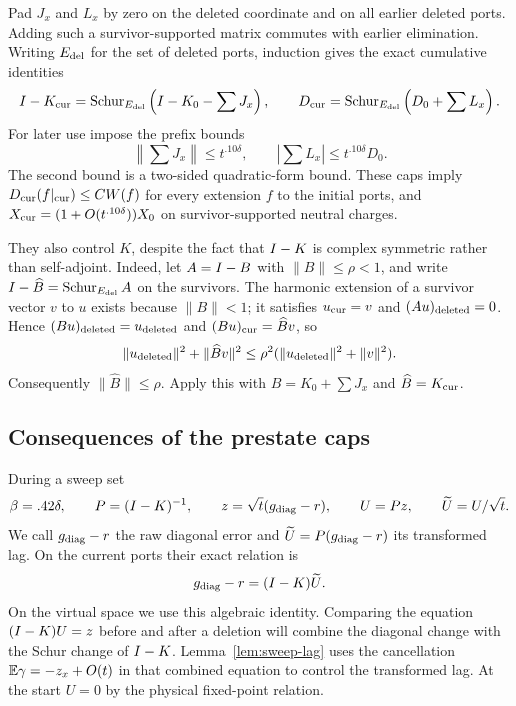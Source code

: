 Pad $J_x$ and $L_x$ by zero on the deleted coordinate and on all
earlier deleted ports. Adding such a survivor-supported matrix commutes
with earlier elimination. Writing $E_{\rm del}$ for the set of deleted
ports, induction gives the exact cumulative identities
\begin{equation}\label{eq:sweep-cumulative-schur}
 I-K_{\rm cur}=\operatorname{Schur}_{E_{\rm del}}\left(I-K_0-\sum J_x\right),\qquad
 D_{\rm cur}=\operatorname{Schur}_{E_{\rm del}}\left(D_0+\sum L_x\right).
\end{equation}
For later use impose the prefix bounds
\begin{equation}\label{eq:sweep-global-caps}
 \left\|\sum J_x\right\|\le t^{.10\delta},\qquad
 \left|\sum L_x\right|\le t^{.10\delta}D_0.
\end{equation}
The second bound is a two-sided quadratic-form bound.
These caps imply $D_{\rm cur}(f|_{\rm cur})\le C W(f)$ for every
extension $f$ to the initial ports, and
$X_{\rm cur}=(1+O(t^{.10\delta}))X_0$ on survivor-supported neutral
charges.

They also control $K$, despite the fact that $I-K$ is complex
symmetric rather than self-adjoint. Indeed, let $A=I-B$ with
$\|B\|\le\rho<1$, and write
$I-\widehat B=\operatorname{Schur}_{E_{\rm del}}A$ on the survivors.
The harmonic extension of a survivor vector $v$ to $u$ exists because
$\|B\|<1$; it satisfies $u_{\rm cur}=v$ and
$(Au)_{\rm deleted}=0$. Hence $(Bu)_{\rm deleted}=u_{\rm deleted}$
and $(Bu)_{\rm cur}=\widehat Bv$, so
\[
 \|u_{\rm deleted}\|^2+\|\widehat Bv\|^2
 \le\rho^2(\|u_{\rm deleted}\|^2+\|v\|^2).
\]
Consequently $\|\widehat B\|\le\rho$. Apply this with
$B=K_0+\sum J_x$ and $\widehat B=K_{\rm cur}$.

\subsection{Consequences of the prestate caps}

During a sweep set
\[
 \beta=.42\delta,\qquad
 P=(I-K)^{-1},\qquad
 z=\sqrt t(g_{\rm diag}-r),\qquad
 U=Pz,\qquad \widetilde U=U/\sqrt t.
\]
We call $g_{\rm diag}-r$ the raw diagonal error and
$\widetilde U=P(g_{\rm diag}-r)$ its transformed lag. On the current
ports their exact relation is
\[
 g_{\rm diag}-r=(I-K)\widetilde U.
\]
On the virtual space we use this algebraic identity. Comparing the equation
$(I-K)U=z$ before and after a deletion
will combine the diagonal change with the Schur change of $I-K$.
Lemma~\ref{lem:sweep-lag} uses the cancellation
$\mathbb E\gamma=-z_x+O(t)$ in that combined equation to control the
transformed lag. At the start $U=0$ by the physical fixed-point relation.

